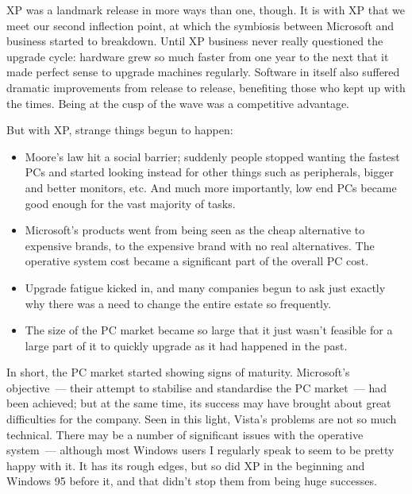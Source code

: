 \documentclass{book}
\begin{document}
XP was a landmark release in more ways than one, though. It is with XP
that we meet our second inflection point, at which the symbiosis
between Microsoft and business started to breakdown. Until XP business
never really questioned the upgrade cycle: hardware grew so much
faster from one year to the next that it made perfect sense to upgrade
machines regularly. Software in itself also suffered dramatic
improvements from release to release, benefiting those who kept up
with the times. Being at the cusp of the wave was a competitive
advantage.

But with XP, strange things begun to happen:

\begin{itemize}
\item Moore's law hit a social barrier; suddenly people stopped
  wanting the fastest PCs and started looking instead for other things
  such as peripherals, bigger and better monitors, etc. And much more
  importantly, low end PCs became good enough for the vast majority of
  tasks.
\item Microsoft's products went from being seen as the cheap
  alternative to expensive brands, to the expensive brand with no real
  alternatives. The operative system cost became a significant part of
  the overall PC cost.
\item Upgrade fatigue kicked in, and many companies begun to ask just
  exactly why there was a need to change the entire estate so
  frequently.
\item The size of the PC market became so large that it just wasn't
  feasible for a large part of it to quickly upgrade as it had
  happened in the past.
\end{itemize}

In short, the PC market started showing signs of maturity. Microsoft's
objective~--- their attempt to stabilise and standardise the PC
market~--- had been achieved; but at the same time, its success may
have brought about great difficulties for the company. Seen in this
light, Vista's problems are not so much technical. There may be a
number of significant issues with the operative system~--- although most
Windows users I regularly speak to seem to be pretty happy with it. It
has its rough edges, but so did XP in the beginning and Windows 95
before it, and that didn't stop them from being huge successes.
\end{document}
